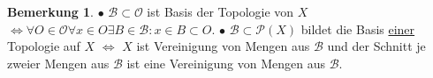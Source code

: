 \documentclass[a4paper,11pt,notitlepage]{report}
\theoremstyle{definition}
\newtheorem{remark}{Bemerkung}[chapter]
\newcommand{\OO}{{\ensuremath{\mathcal{O}}}}
\begin{document}
\begin{remark}
	$\bullet$ $\mathcal{B} \subset \OO$ ist Basis der Topologie von $X$ $\Leftrightarrow \forall O \in \OO \forall x \in O \exists B \in \mathcal{B} \colon x \in B \subset O$.
	\newline
	$\bullet$ $\mathcal{B} \subset \mathcal{P}(X)$ bildet die Basis \underline{einer} Topologie auf $X$ $\Leftrightarrow$ $X$ ist Vereinigung von Mengen aus $\mathcal{B}$ und der Schnitt je zweier Mengen aus $\mathcal{B}$ ist eine Vereinigung von Mengen aus $\mathcal{B}$.
	\newline
	\begin{figure}[h]
		\centering
		\qquad
	\end{figure}
\end{remark}
\end{document}
